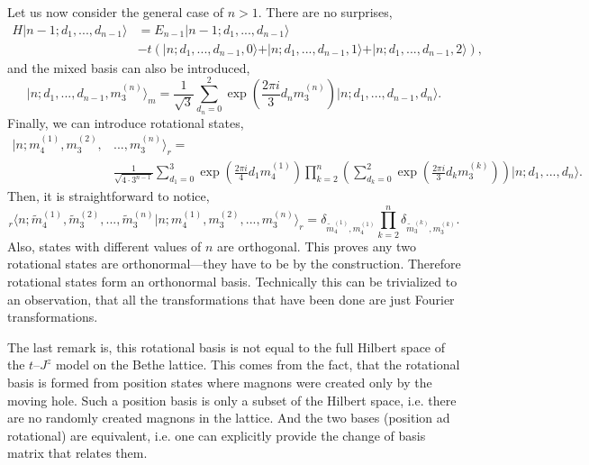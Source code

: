 \documentclass[10pt, a4paper, onecolumn]{article}
\newcommand{\ket}[1]{\vert #1 \rangle}
\newcommand{\mean}[1]{\langle#1\rangle}
\begin{document}
Let us now consider the general case of $n>1$. There are no surprises,
\begin{equation}
\begin{aligned}
	H\ket{n-1;d_1,...,d_{n-1}} &= E_{n-1} \ket{n-1;d_1,...,d_{n-1}} \\
	&- t(\ket{n;d_1,...,d_{n-1},0}+\ket{n;d_1,...,d_{n-1},1}+\ket{n;d_1,...,d_{n-1},2}),
\end{aligned}
\end{equation}
and the mixed basis can also be introduced,
\begin{equation}
	\ket{n;d_1,...,d_{n-1},m^{(n)}_3}_m = \frac{1}{\sqrt{3}}\sum_{d_n=0}^2 \exp\left(\frac{2 \pi i}{3}d_n m^{(n)}_3\right)\ket{n;d_1,...,d_{n-1},d_n}.
\end{equation}
Finally, we can introduce rotational states,
\begin{equation}
\begin{aligned}
	\ket{n;m^{(1)}_4,m^{(2)}_3,&...,m^{(n)}_3}_r = \\
	&\frac{1}{\sqrt{4 \cdot 3^{n-1}}} \sum_{d_1=0}^3 \exp\left(\frac{2 \pi i}{4}d_1 m^{(1)}_4\right) \prod_{k=2}^n \left( \sum_{d_k=0}^2  \exp\left(\frac{2 \pi i}{3}d_k m^{(k)}_3\right) \right) \ket{n;d_1,...,d_n}.
\end{aligned}
\end{equation}
Then, it is straightforward to notice,
\begin{equation}
	_r\mean{
		n;\tilde{m}^{(1)}_4,\tilde{m}^{(2)}_3,...,\tilde{m}^{(n)}_3 
		\vert 
		n;m^{(1)}_4,m^{(2)}_3,...,m^{(n)}_3
	}_r = \delta_{\tilde{m}^{(1)}_4,m^{(1)}_4} \prod_{k=2}^{n} \delta_{\tilde{m}^{(k)}_3,m^{(k)}_3}.
\end{equation}
Also, states with different values of $n$ are orthogonal. This proves any two rotational states are orthonormal---they have to be by the construction. Therefore rotational states form an orthonormal basis. Technically this can be trivialized to an observation, that all the transformations that have been done are just Fourier transformations. 

The last remark is, this rotational basis is not equal to the full Hilbert space of the $t$--$J^z$ model on the Bethe lattice. This comes from the fact, that the rotational basis is formed from position states where magnons were created only by the moving hole. Such a position basis is only a subset of the Hilbert space, i.e. there are no randomly created magnons in the lattice. And the two bases (position ad rotational) are equivalent, i.e. one can explicitly provide the change of basis matrix that relates them.
\end{document}
